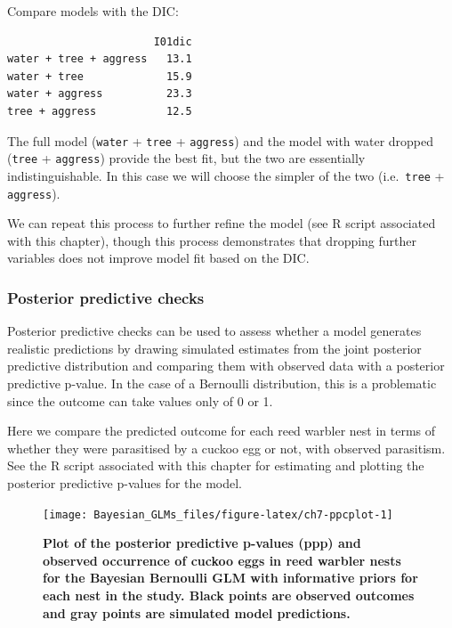 \documentclass[
]{book}
\begin{document}
Compare models with the DIC:

\begin{verbatim}
                       I01dic
water + tree + aggress   13.1
water + tree             15.9
water + aggress          23.3
tree + aggress           12.5
\end{verbatim}

The full model (\texttt{water} + \texttt{tree} + \texttt{aggress}) and the model with water dropped (\texttt{tree} + \texttt{aggress}) provide the best fit, but the two are essentially indistinguishable. In this case we will choose the simpler of the two (i.e.~\texttt{tree} + \texttt{aggress}).

We can repeat this process to further refine the model (see R script associated with this chapter), though this process demonstrates that dropping further variables does not improve model fit based on the DIC.

\hypertarget{bern-ppc}{%
\subsubsection{Posterior predictive checks}\label{bern-ppc}}

Posterior predictive checks can be used to assess whether a model generates realistic predictions by drawing simulated estimates from the joint posterior predictive distribution and comparing them with observed data with a posterior predictive p-value. In the case of a Bernoulli distribution, this is a problematic since the outcome can take values only of 0 or 1.

Here we compare the predicted outcome for each reed warbler nest in terms of whether they were parasitised by a cuckoo egg or not, with observed parasitism. See the R script associated with this chapter for estimating and plotting the posterior predictive p-values for the model.



\begin{figure}

{\centering \texttt{[image: Bayesian\_GLMs\_files/figure-latex/ch7-ppcplot-1]} 

}

\caption{\textbf{Plot of the posterior predictive p-values (ppp) and observed occurrence of cuckoo eggs in reed warbler nests for the Bayesian Bernoulli GLM with informative priors for each nest in the study. Black points are observed outcomes and gray points are simulated model predictions.}}\label{fig:ch7-ppcplot}
\end{figure}
\end{document}
